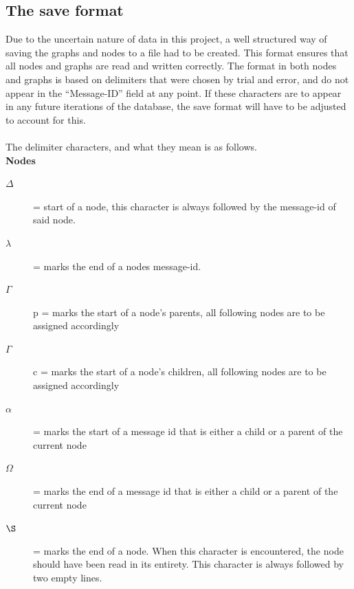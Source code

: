 \documentclass[a4paper,english]{report}
\begin{document}
\subsection{The save format}

Due to the uncertain nature of data in this project, a well structured way of saving the graphs and nodes to a file had to be created. This format ensures that all nodes and graphs are read and written correctly. 
The format in both nodes and graphs is based on delimiters that were chosen by trial and error, and do not appear in the “Message-ID” field at any point. If these characters are to appear in any future iterations of the database, the save format will have to be adjusted to account for this.\\\\
The delimiter characters, and what they mean is as follows.\\

\textbf{Nodes}\\

\begin{description}


\item[\( \Delta \)] = start of a node, this character is always followed by the message-id of said node.\\

\item[\( \lambda \)] = marks the end of a nodes message-id.\\

\item[\( \Gamma \)] p = marks the start of a node's parents, all following nodes are to be assigned accordingly \\

\item[\( \Gamma \)]  c = marks the start of a node's children, all following nodes are to be assigned accordingly \\

\item[\( \alpha \)] = marks the start of a message id that is either a child or a parent of the current node \\

\item[\( \Omega \)] = marks the end of a message id that is either a child or a parent of the current node\\

\item[\( \S \)] = marks the end of a node. When this character is encountered, the node should have been read in its entirety. This character is always followed by two empty lines.\\

\end{description}
\end{document}
